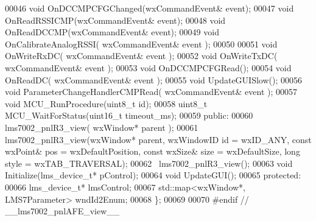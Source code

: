 \begin{DoxyCode}
00046         \textcolor{keywordtype}{void} OnDCCMPCFGChanged(wxCommandEvent& event);
00047         \textcolor{keywordtype}{void} OnReadRSSICMP(wxCommandEvent& event);
00048         \textcolor{keywordtype}{void} OnReadDCCMP(wxCommandEvent& event);
00049         \textcolor{keywordtype}{void} OnCalibrateAnalogRSSI( wxCommandEvent& event );
00050 
00051         \textcolor{keywordtype}{void} OnWriteRxDC( wxCommandEvent& event );
00052         \textcolor{keywordtype}{void} OnWriteTxDC( wxCommandEvent& event );
00053         \textcolor{keywordtype}{void} OnDCCMPCFGRead();
00054         \textcolor{keywordtype}{void} OnReadDC( wxCommandEvent& event );
00055         \textcolor{keywordtype}{void} UpdateGUISlow();
00056         \textcolor{keywordtype}{void} ParameterChangeHandlerCMPRead( wxCommandEvent& event );
00057         \textcolor{keywordtype}{void} MCU_RunProcedure(uint8\_t \textcolor{keywordtype}{id});
00058         uint8\_t MCU_WaitForStatus(uint16\_t timeout_ms);
00059     \textcolor{keyword}{public}:
00060         lms7002_pnlR3_view( wxWindow* parent );
00061         lms7002_pnlR3_view(wxWindow* parent, wxWindowID \textcolor{keywordtype}{id} = wxID\_ANY, \textcolor{keyword}{const} wxPoint& pos = 
      wxDefaultPosition, \textcolor{keyword}{const} wxSize& size = wxDefaultSize, \textcolor{keywordtype}{long} style = wxTAB\_TRAVERSAL);
00062         ~lms7002_pnlR3_view();
00063         \textcolor{keywordtype}{void} Initialize(lms_device_t* pControl);
00064         \textcolor{keywordtype}{void} UpdateGUI();
00065 \textcolor{keyword}{protected}:
00066     lms_device_t* lmsControl;
00067     std::map<wxWindow*, LMS7Parameter> wndId2Enum;
00068 \};
00069 
00070 \textcolor{preprocessor}{#endif // \_\_lms7002\_pnlAFE\_view\_\_}
\end{DoxyCode}
